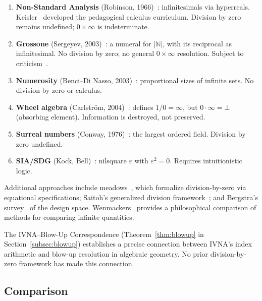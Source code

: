 \documentclass[12pt]{article}
\theoremstyle{definition}
\theoremstyle{remark}
\begin{document}
\begin{enumerate}
\item \textbf{Non-Standard Analysis} (Robinson, 1966)~\cite{robinson1966}:
  infinitesimals via hyperreals. Keisler~\cite{keisler1976} developed
  the pedagogical calculus curriculum. Division by zero remains undefined;
  $0 \times \infty$ is indeterminate.

\item \textbf{Grossone}
  (Sergeyev, 2003)~\cite{sergeyev2003,sergeyev2017,sergeyev2019}:
  a numeral for $|\mathbb{N}|$, with its reciprocal as infinitesimal.
  No division by zero; no general $0 \times \infty$ resolution.
  Subject to criticism~\cite{gutman2017}.

\item \textbf{Numerosity} (Benci--Di Nasso, 2003)~\cite{benci2003,benci2019}:
  proportional sizes of infinite sets. No division by zero or calculus.

\item \textbf{Wheel algebra} (Carlstr\"om, 2004)~\cite{carlstrom2004}:
  defines $1/0 = \infty$, but $0 \cdot \infty = \bot$ (absorbing
  element). Information is destroyed, not preserved.

\item \textbf{Surreal numbers} (Conway, 1976)~\cite{conway1976}:
  the largest ordered field. Division by zero undefined.

\item \textbf{SIA/SDG} (Kock, Bell)~\cite{kock2006,bell1998}:
  nilsquare $\varepsilon$ with $\varepsilon^2 = 0$. Requires
  intuitionistic logic.
\end{enumerate}

Additional approaches include meadows~\cite{bergstra2009}, which
formalize division-by-zero via equational specifications;
Saitoh's generalized division framework~\cite{saitoh2014}; and
Bergstra's survey~\cite{bergstra2019} of the design space.
Wenmackers~\cite{wenmackers2024} provides a philosophical comparison
of methods for comparing infinite quantities.

The IVNA--Blow-Up Correspondence (Theorem~\ref{thm:blowup} in
Section~\ref{subsec:blowup}) establishes a precise connection
between IVNA's index arithmetic and blow-up resolution in algebraic
geometry. No prior division-by-zero framework has made this
connection.

\subsection{Comparison}
\end{document}
